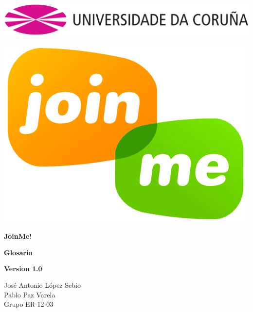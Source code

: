 \documentclass[12pt, a4paper, titlepage]{article}
\begin{document}

\begin{titlepage}

\includegraphics[width=15cm]{Imagenes/Simbolo_logo_UDC.png}

\vspace{3cm}

\begin{center}
\includegraphics[scale=0.3]{Imagenes/1a_Practica_ER_14-15.png}
\end{center}


\begin{flushright}
	
	\LARGE{\textbf{ JoinMe!}}
	
	\LARGE{\textbf{Glosario}}
	
	\large{\textbf{Version 1.0}}
\end{flushright}
\vspace{1cm}
\begin{center}
José Antonio López Sebio\\
Pablo Paz Varela\\
Grupo ER-12-03\\
\end{center}



\end{titlepage}
\end{document}

